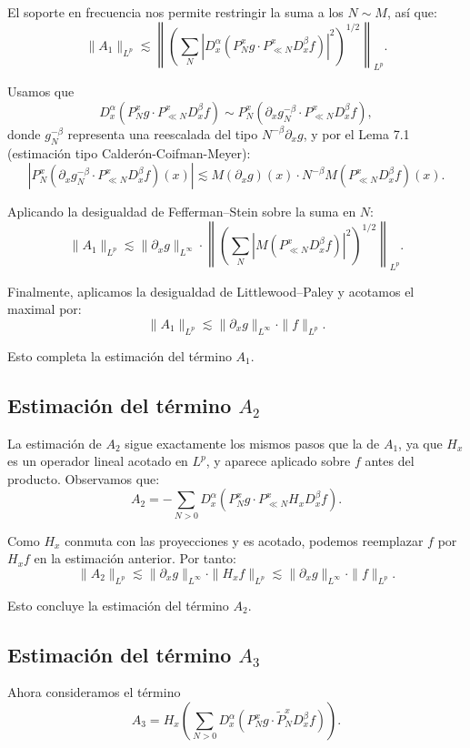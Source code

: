 \documentclass{aleph-revista}
\begin{document}
El soporte en frecuencia nos permite restringir la suma a los \( N \sim M \), as\'i que:
\[
\|A_1\|_{L^p} \lesssim \left\| \left( \sum_{N} |D_x^\alpha (P_N^x g \cdot P_{\ll N}^x D_x^\beta f)|^2 \right)^{1/2} \right\|_{L^p}.
\]

Usamos que
\[
D_x^\alpha (P_N^x g \cdot P_{\ll N}^x D_x^\beta f) \sim P_N^x (\partial_x g_N^{-\beta} \cdot P_{\ll N}^x D_x^\beta f),
\]
donde \( g_N^{-\beta} \) representa una reescalada del tipo \( N^{-\beta} \partial_x g \), y por el Lema 7.1 (estimaci\'on tipo Calder\'on-Coifman-Meyer):
\[
|P_N^x (\partial_x g_N^{-\beta} \cdot P_{\ll N}^x D_x^\beta f)(x)| \lesssim M(\partial_x g)(x) \cdot N^{-\beta} M(P_{\ll N}^x D_x^\beta f)(x).
\]

Aplicando la desigualdad de Fefferman--Stein sobre la suma en \( N \):
\[
\|A_1\|_{L^p} \lesssim \| \partial_x g \|_{L^\infty} \cdot \left\| \left( \sum_{N} |M(P_{\ll N}^x D_x^\beta f)|^2 \right)^{1/2} \right\|_{L^p}.
\]

Finalmente, aplicamos la desigualdad de Littlewood--Paley y acotamos el maximal por:
\[
\|A_1\|_{L^p} \lesssim \| \partial_x g \|_{L^\infty} \cdot \|f\|_{L^p}.
\]

Esto completa la estimaci\'on del t\'ermino $A_1$.
\subsection*{Estimaci\'on del t\'ermino $A_2$}

La estimaci\'on de $A_2$ sigue exactamente los mismos pasos que la de $A_1$, ya que $H_x$ es un operador lineal acotado en $L^p$, y aparece aplicado sobre $f$ antes del producto. Observamos que:
\[
A_2 = - \sum_{N > 0} D_x^\alpha (P_N^x g \cdot P_{\ll N}^x H_x D_x^\beta f).
\]

Como $H_x$ conmuta con las proyecciones y es acotado, podemos reemplazar $f$ por $H_x f$ en la estimaci\'on anterior. Por tanto:
\[
\|A_2\|_{L^p} \lesssim \| \partial_x g \|_{L^\infty} \cdot \| H_x f \|_{L^p} \lesssim \| \partial_x g \|_{L^\infty} \cdot \|f\|_{L^p}.
\]

Esto concluye la estimaci\'on del t\'ermino $A_2$.
\subsection*{Estimaci\'on del t\'ermino $A_3$}

Ahora consideramos el t\'ermino
\[
A_3 = H_x \left( \sum_{N>0} D_x^\alpha (P_N^x g \cdot \widetilde{P}_N^x D_x^\beta f) \right).
\]
\end{document}
